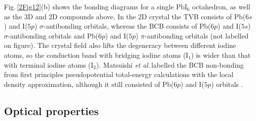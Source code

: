 Fig.\,\ref{2Fig12}(b) shows the bonding diagrams for a single $\textrm{PbI}_6$ octahedron, as well as the 3D and 2D compounds above. In the 2D crystal the TVB consists of Pb($6s$) and I($5p$) $\sigma$-antibonding orbitals, whereas the BCB consists of Pb($6p$) and I($5s$) $\sigma$-antibonding orbitals and Pb($6p$) and I($5p$) $\pi$-antibonding orbitals (not labelled on figure). The crystal field also lifts the degeneracy between different iodine atoms, so the conduction band with bridging iodine atoms ($\textrm{I}_1$) is wider than that with terminal iodine atoms ($\textrm{I}_2$). Matsuishi \textit{et al.}\,labelled the BCB non-bonding from first principles pseudopotential total-energy calculations with the local density approximation, although it still consisted of Pb($6p$) and I($5p$) orbitals \cite{Matsuishi2004}.

\subsection{Optical properties}
